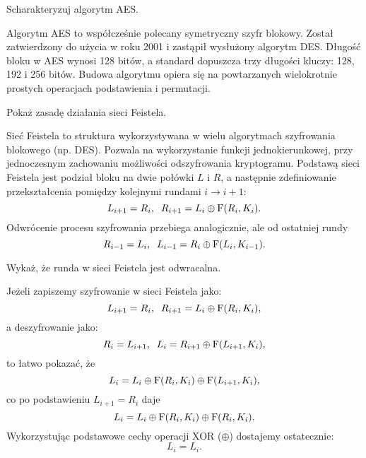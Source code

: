 \documentclass[answers,11pt]{exam}
\begin{document}
\begin{questions}
\question Scharakteryzuj algorytm AES.
\begin{solution}
Algorytm AES to współcześnie polecany symetryczny szyfr blokowy. Został zatwierdzony do użycia w roku 2001 i zastąpił wysłużony algorytm DES. Długość bloku w AES wynosi 128 bitów, a standard dopuszcza trzy długości kluczy: 128, 192 i 256 bitów. Budowa algorytmu opiera się na powtarzanych wielokrotnie prostych operacjach podstawienia i permutacji. 
\end{solution}

\question Pokaż zasadę działania sieci Feistela.
\begin{solution} 
Sieć Feistela to struktura wykorzystywana w wielu algorytmach szyfrowania blokowego (np. DES). Pozwala na wykorzystanie funkcji jednokierunkowej, przy jednoczesnym zachowaniu możliwości odszyfrowania kryptogramu. Podstawą sieci Feistela jest podział bloku na dwie połówki $L$ i $R$, a następnie zdefiniowanie przekształcenia pomiędzy kolejnymi rundami $i \rightarrow i+1$:
\begin{equation}
L_{i+1} = R_i, \;\; R_{i+1}= L_i \oplus {\rm F}(R_i, K_i).
\end{equation}
Odwrócenie procesu szyfrowania przebiega analogicznie, ale od ostatniej rundy
\begin{equation}
R_{i-1} = L_{i},\;\; L_{i-1} = R_{i} \oplus {\rm F}(L_{i}, K_{i-1}).
\end{equation}
\end{solution}

\question Wykaż, że runda w sieci Feistela jest odwracalna.
\begin{solution} 
Jeżeli zapiszemy szyfrowanie w sieci Feistela jako:
\begin{equation}
L_{i+1} = R_i, \;\; R_{i+1}= L_i \oplus {\rm F}(R_i, K_i),
\end{equation}
a deszyfrowanie jako:
\begin{equation}
R_{i} = L_{i+1},\;\; L_{i} = R_{i+1} \oplus {\rm F}(L_{i+1}, K_{i}),
\end{equation}
to łatwo pokazać, że
\begin{equation}
L_{i} = L_i \oplus {\rm F}(R_i, K_i) \oplus {\rm F}(L_{i+1}, K_{i}),
\end{equation}
co po podstawieniu $L_{i+1} = R_i$ daje
\begin{equation}
L_{i} = L_i \oplus {\rm F}(R_i, K_i) \oplus {\rm F}(R_i, K_{i}).
\end{equation}
Wykorzystując podstawowe cechy operacji XOR ($\oplus$) dostajemy ostatecznie:
\begin{equation}
L_{i} = L_i.
\end{equation}
\end{solution} 



\end{questions}
\end{document}

